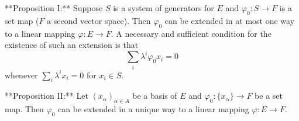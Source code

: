 **Proposition I:** Suppose $S$ is a system of generators for $E$ and $\varphi_0: S \to F$ is a set map ($F$ a second vector space). Then $\varphi_0$ can be extended in at most one way to a linear mapping $\varphi: E \to F$. A necessary and sufficient condition for the existence of such an extension is that
$$\sum_i \lambda^i \varphi_0 x_i = 0$$
whenever $\sum_i \lambda^i x_i = 0$ for $x_i \in S$.

**Proposition II:** Let $(x_\alpha)_{\alpha \in A}$ be a basis of $E$ and $\varphi_0: \{x_\alpha\} \to F$ be a set map. Then $\varphi_0$ can be extended in a unique way to a linear mapping $\varphi: E \to F$.
